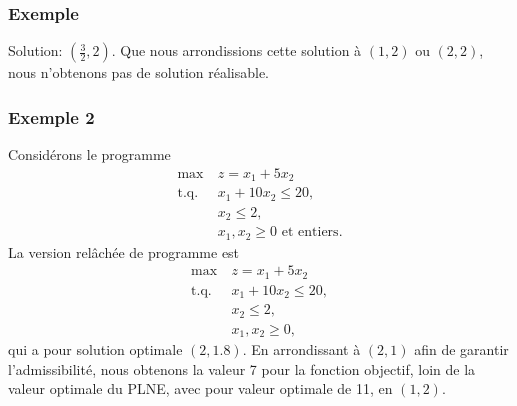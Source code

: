 \documentclass[usepdftitle=false]{beamer}
\def\st{\mbox{t.q. }}
\begin{document}
\begin{frame}
\frametitle{Exemple}

Solution: $\left( \frac{3}{2},2\right)$. Que nous arrondissions cette solution à $(1,2)$ ou $(2,2)$, nous n'obtenons pas de solution réalisable.
\begin{center}
\end{center}

\end{frame}

\begin{frame}
\frametitle{Exemple 2}

Considérons le programme
\begin{align*}
\max\ & z = x_1+5x_2\\
\st & x_1+10x_2 \leq 20, \\
& x_2 \leq 2, \\
& x_1, x_2 \geq 0 \mbox{ et entiers}.
\end{align*}
La version relâchée de programme est
\begin{align*}
\max\ & z = x_1+5x_2\\
\st & x_1+10x_2 \leq 20, \\
& x_2 \leq 2, \\
& x_1, x_2 \geq 0,
\end{align*}
qui a pour solution optimale $(2, 1.8)$. En arrondissant à $(2,1)$ afin de garantir l'admissibilité, nous obtenons la valeur 7 pour la fonction objectif, loin de la valeur optimale du PLNE, avec pour valeur optimale de 11, en $(1,2)$.

\end{frame}
\end{document}
